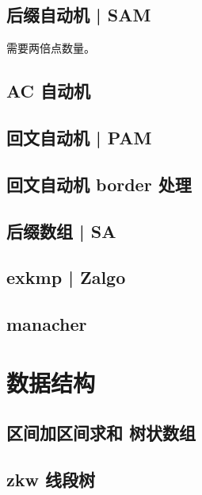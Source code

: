 \documentclass{article}
\begin{document}
\subsection{后缀自动机 | SAM}
需要两倍点数量。

\newpage

\subsection{AC 自动机}

\newpage

\subsection{回文自动机 | PAM}

\newpage

\subsection{回文自动机 border 处理}

\newpage

\subsection{后缀数组 | SA}

\newpage

\subsection{exkmp | Zalgo}


\subsection{manacher}

\newpage

\section{数据结构}
\subsection{区间加区间求和 树状数组}

\newpage

\subsection{zkw 线段树}

\newpage
\end{document}
